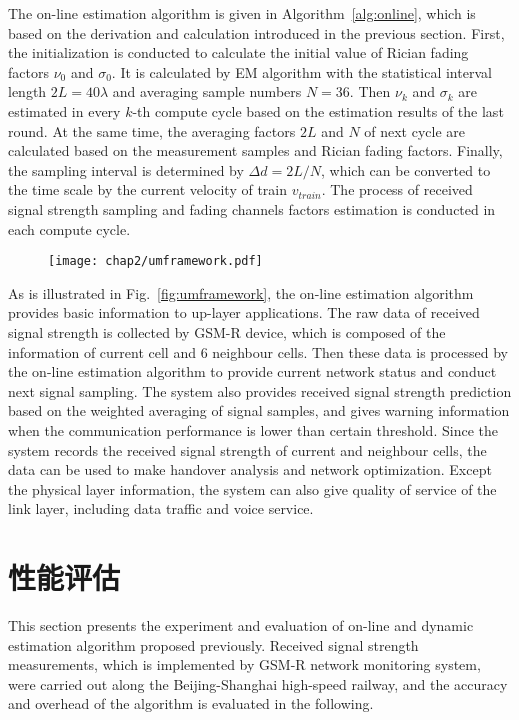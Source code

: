 The on-line estimation algorithm is given in Algorithm~\ref{alg:online}, which is based on the derivation and calculation introduced in the previous section. First, the initialization is conducted to calculate the initial value of Rician fading factors $\nu_0$ and $\sigma_0$. It is calculated by EM algorithm with the statistical interval length $2L=40\lambda$ and averaging sample numbers $N=36$. Then $\nu_k$ and $\sigma_k$ are estimated in every $k$-th compute cycle based on the estimation results of the last round. At the same time, the averaging factors $2L$ and $N$ of next cycle are calculated based on the measurement samples and Rician fading factors. Finally, the sampling interval is determined by $\Delta d=2L/N$, which can be converted to the time scale by the current velocity of train $v_{train}$. The process of received signal strength sampling and fading channels factors estimation is conducted in each compute cycle.

\begin{figure}[!htp]
\centering
    \texttt{[image: chap2/umframework.pdf]}
\end{figure}

As is illustrated in Fig.~\ref{fig:umframework}, the on-line estimation algorithm provides basic information to up-layer applications. The raw data of received signal strength is collected by GSM-R device, which is composed of the information of current cell and 6 neighbour cells. Then these data is processed by the on-line estimation algorithm to provide current network status and conduct next signal sampling. The system also provides received signal strength prediction based on the weighted averaging of signal samples, and gives warning information when the communication performance is lower than certain threshold. Since the system records the received signal strength of current and neighbour cells, the data can be used to make handover analysis and network optimization. Except the physical layer information, the system can also give quality of service of the link layer, including data traffic and voice service.

\section{性能评估}
\label{chap:evaluation_phy}

This section presents the experiment and evaluation of on-line and dynamic estimation algorithm proposed previously. Received signal strength measurements, which is implemented by GSM-R network monitoring system, were carried out along the Beijing-Shanghai high-speed railway, and the accuracy and overhead of the algorithm is evaluated in the following.

